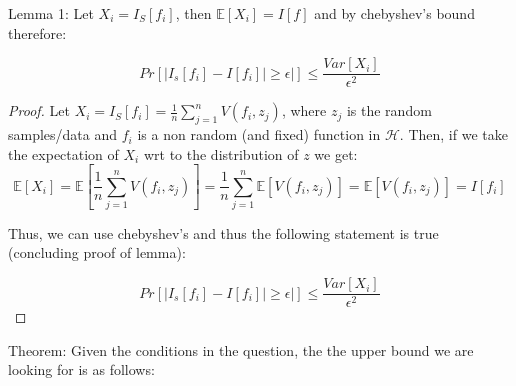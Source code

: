 \documentclass[12pt]{report}
\begin{document}
Lemma 1: Let $X_i = I_S[f_i]$, then $\mathbb{E}[X_i] = I[f]$ and by chebyshev's bound therefore:

$$ Pr[ | I_s[f_i] - I[f_i] | \geq \epsilon|] \leq \frac{ Var[X_i] }{ \epsilon^2 } $$

\begin{proof}
Let $X_i = I_S[f_i] = \frac{1}{n} \sum^{n}_{j=1} V(f_i, z_j)$, where $z_j$ is the random samples/data and $f_i$ is a non random (and fixed) function in $\mathcal{H}$. Then, if we take the expectation of $X_i$ wrt to the distribution of $z$ we get:
$$\mathbb{E}[X_i]  = \mathbb{E}[\frac{1}{n} \sum^{n}_{j=1} V(f_i, z_j)] = \frac{1}{n} \sum^{n}_{j=1} \mathbb{E}[V(f_i, z_j)] =  \mathbb{E}[V(f_i, z_j)] = I[f_i]$$

Thus, we can use chebyshev's and thus the following statement is true (concluding proof of lemma):

$$ Pr[ | I_s[f_i] - I[f_i] | \geq \epsilon|] \leq \frac{ Var[X_i] }{ \epsilon^2 } $$

\end{proof}

Theorem: Given the conditions in the question, the the upper bound we are looking for is as follows:
\end{document}
